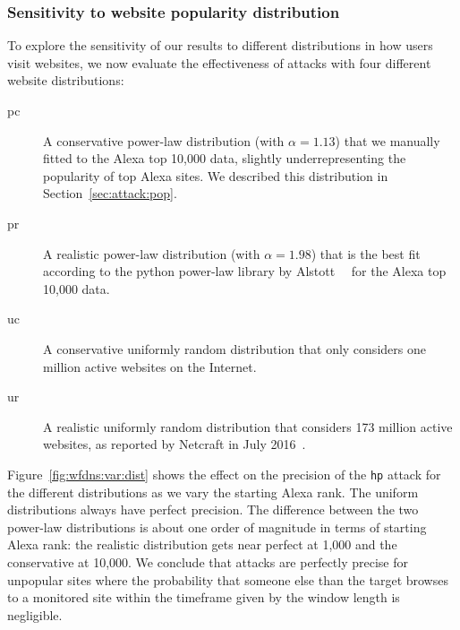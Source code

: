 
\subsubsection{Sensitivity to website popularity distribution}

To explore the sensitivity of our results to different distributions in
how users visit websites, we now evaluate the effectiveness of \name
attacks with four different website distributions:
\begin{description}
	\item[pc] A conservative power-law distribution
	(with $\alpha=1.13$)
	that we manually fitted to the Alexa top 10,000 data,
	slightly underrepresenting the popularity of top Alexa sites.
	We described this distribution in Section~\ref{sec:attack:pop}.
	\item[pr] A realistic power-law distribution
	(with $\alpha=1.98$)
	that is the best fit according to
	the python power-law library by Alstott~\ea~\cite{power-law} for the Alexa
	top 10,000 data.
	\item[uc] A conservative uniformly random distribution that
	only considers one million active websites on the Internet.
	\item[ur] A realistic uniformly random distribution that
          considers 173 million active websites, as reported by Netcraft
          in July 2016~\cite{numberofwebsites}.
\end{description}
Figure~\ref{fig:wfdns:var:dist} shows the effect on the precision of the
\texttt{hp} attack for the different distributions as we vary the starting
Alexa rank. The uniform distributions always have perfect precision.
The difference between the two power-law distributions is about one order of
magnitude in terms of starting Alexa rank: the realistic distribution gets
near perfect at 1,000 and the conservative at 10,000.
We conclude that \name attacks are perfectly precise for unpopular sites
where the probability that someone else than the target browses to a monitored
site within the timeframe given by the window length is negligible.
